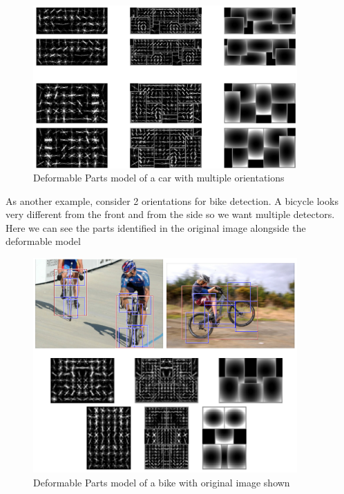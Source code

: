 \documentclass{article}
\begin{document}
\begin{figure}[H]
	\center
	\includegraphics[width=0.9\textwidth]{car_model.png}
    \caption{Deformable Parts model of a car with multiple orientations}
    \label{fig:car_model}
\end{figure}

As another example, consider 2 orientations for bike detection. A bicycle looks very
different from the front and from the side so we want multiple detectors. Here we can
see the parts identified in the original image alongside the deformable model

\begin{figure}[h]
	\center
	\includegraphics[width=0.9\textwidth]{deformable_bike_model.png}
    \caption{Deformable Parts model of a bike with original image shown}
    \label{fig:deformable_bike_model}
\end{figure}
\end{document}

